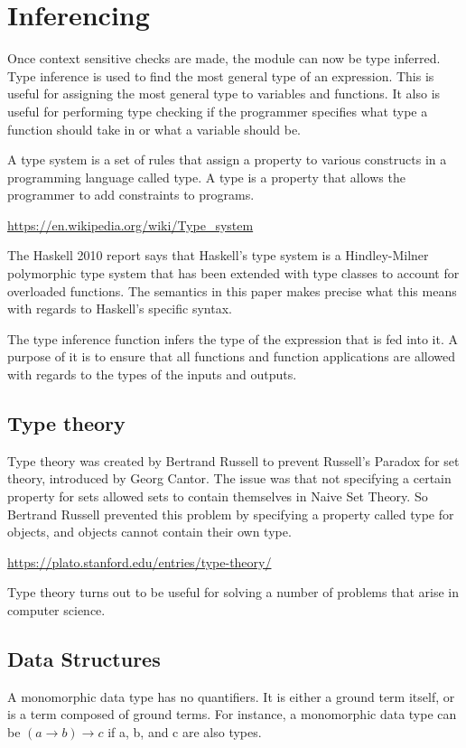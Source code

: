 \chapter{Inferencing}
Once context sensitive checks are made, the module can now be type inferred. Type inference is used to find the most general type of an expression. This is useful for assigning the most general type to variables and functions. It also is useful for performing type checking if the programmer specifies what type a function should take in or what a variable should be.

A type system is a set of rules that assign a property to various constructs in a programming language called type. A type is a property that allows the programmer to add constraints to programs.

\url{https://en.wikipedia.org/wiki/Type_system}

The Haskell 2010 report says that Haskell's type system is a Hindley-Milner polymorphic type system that has been extended with type classes to account for overloaded functions. The semantics in this paper makes precise what this means with regards to Haskell's specific syntax.

The type inference function infers the type of the expression that is fed into it. A purpose of it is to ensure that all functions and function applications are allowed with regards to the types of the inputs and outputs.

\section{Type theory}
Type theory was created by Bertrand Russell to prevent Russell's Paradox for set theory, introduced by Georg Cantor. The issue was that not specifying a certain property for sets allowed sets to contain themselves in Naive Set Theory. So Bertrand Russell prevented this problem by specifying a property called type for objects, and objects cannot contain their own type.

\url{https://plato.stanford.edu/entries/type-theory/}

Type theory turns out to be useful for solving a number of problems that arise in computer science.

\section{Data Structures}

A monomorphic data type has no quantifiers. It is either a ground term itself, or is a term composed of ground terms. For instance, a monomorphic data type can be $(a \rightarrow b) \rightarrow c$ if a, b, and c are also types.

